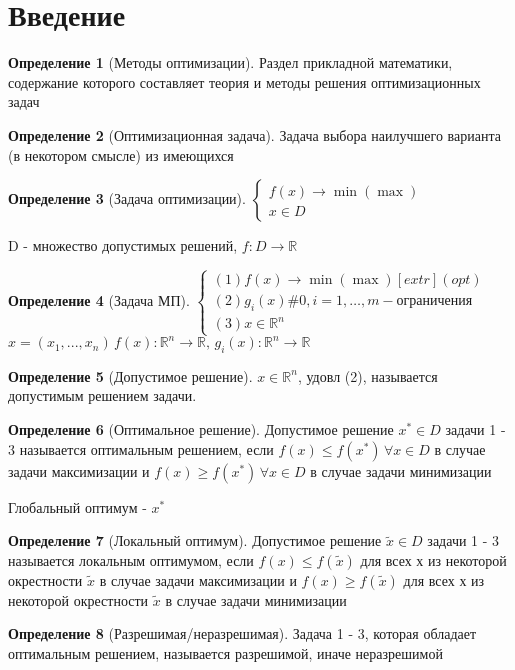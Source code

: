 \documentclass[a4paper]{article}
\theoremstyle{definition}
\newtheorem*{definition}{Определение}
\theoremstyle{remark}
\begin{document}
\tableofcontents
\section{Введение}
\begin{definition}[Методы оптимизации]
    Раздел прикладной математики, содержание которого составляет теория и методы решения оптимизационных задач
\end{definition}
\begin{definition}[Оптимизационная задача]
    Задача выбора наилучшего варианта (в некотором смысле) из имеющихся
\end{definition}
\begin{definition}[Задача оптимизации]
        $\begin{cases}
        f(x)\to \min(\max) \\
        x\in D
    \end{cases}$
\end{definition}
D - множество допустимых решений, $f:D\to \mathbb{R}$
\begin{definition}[Задача МП]
    $\begin{cases}
        (1) f(x)\to \min (\max) [extr] (opt)\\
        (2) g_i(x) \# 0, i=1,\dots, m - \text{ограничения} \\
        (3)x\in \mathbb{R}^n 
    \end{cases}$
    \(x = (x_1, ..., x_n) \, f(x): \mathbb{R}^n \to \mathbb{R}, \, g_i(x) : \mathbb{R}^n \to \mathbb{R}\)
\end{definition}
\begin{definition}[Допустимое решение]
    $x\in \mathbb{R}^n$, удовл (2), называется допустимым решением задачи.
\end{definition}
\begin{definition}[Оптимальное решение]
    Допустимое решение $x^*\in D$ задачи 1 - 3 называется оптимальным решением, если $f(x) \leq f(x^*) \, \forall x\in D$ в случае задачи максимизации и $f(x) \geq f(x^*) \, \forall x\in D$ в случае задачи минимизации
\end{definition}
Глобальный оптимум -  $x^*$
\begin{definition}[Локальный оптимум]
    Допустимое решение $\widetilde{x}\in D$ задачи 1 - 3 называется локальным оптимумом, если $f(x) \leq f(\widetilde{x})$ для всех х из некоторой окрестности $\widetilde{x}$ в случае задачи максимизации и $f(x) \geq f(\widetilde{x})$ для всех х из некоторой окрестности $\widetilde{x}$ в случае задачи минимизации
\end{definition}
\begin{definition}[Разрешимая/неразрешимая]
    Задача 1 - 3, которая обладает оптимальным решением, называется разрешимой, иначе неразрешимой
\end{definition}
\end{document}

